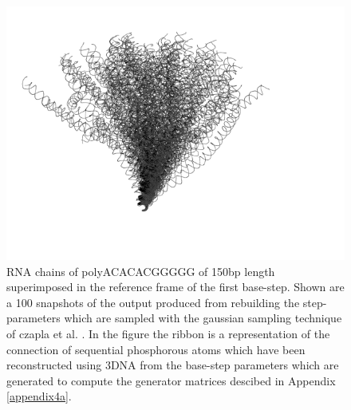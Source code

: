 \begin{figure}
\centering
\includegraphics[angle=0, scale=0.9]{Chapter4/polyacacacggggg_all.png}
\caption{RNA chains of polyACACACGGGGG of 150bp length superimposed in
  the  reference  frame  of  the  first base-step.  Shown  are  a  100
  snapshots of the output produced from rebuilding the step-parameters
  which are sampled with the  gaussian sampling technique of czapla et
  al. \cite{czapla2006}.  In the figure the ribbon is a representation
  of the  connection of sequential  phosphorous atoms which  have been
  reconstructed  using 3DNA  from the  base-step parameters  which are
  generated  to compute  the generator  matrices descibed  in Appendix
  \ref{appendix4a}.}
\label{rnatree}
\end{figure}  


















